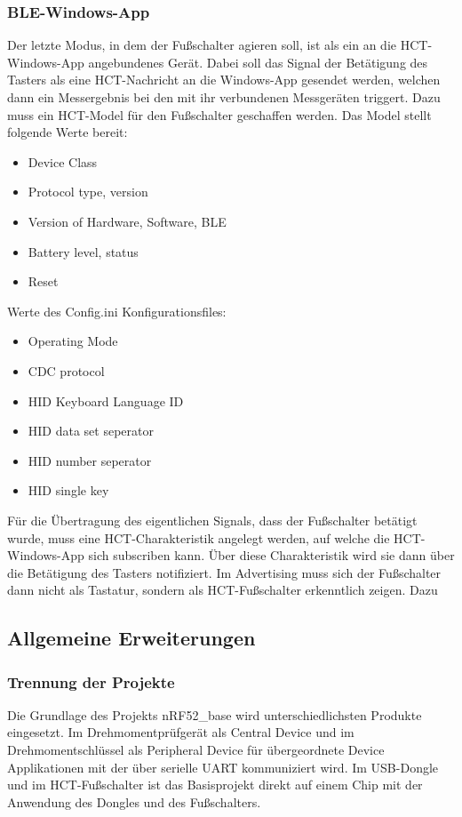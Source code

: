\subsubsection{BLE-Windows-App}
Der letzte Modus, in dem der Fußschalter agieren soll, ist als ein an die HCT-Windows-App angebundenes Gerät. Dabei soll das Signal der Betätigung des Tasters als eine HCT-Nachricht an die Windows-App gesendet werden, welchen dann ein Messergebnis bei den mit ihr verbundenen Messgeräten triggert. Dazu muss ein HCT-Model für den Fußschalter geschaffen werden. Das Model stellt folgende Werte bereit:
\begin{itemize}
	\item Device Class
	\item Protocol type, version 
	\item Version of Hardware, Software, BLE
	\item Battery level, status
	\item Reset 
\end{itemize}

Werte des Config.ini Konfigurationsfiles:
\begin{itemize}
	\item Operating Mode 
	\item CDC protocol 
	\item HID Keyboard Language ID 
	\item HID data set seperator 
	\item HID number seperator
	\item HID single key 
\end{itemize}

Für die Übertragung des eigentlichen Signals, dass der Fußschalter betätigt wurde, muss eine HCT-Charakteristik angelegt werden, auf welche die HCT-Windows-App sich subscriben kann. Über diese Charakteristik wird sie dann über die Betätigung des Tasters notifiziert. Im Advertising muss sich der Fußschalter dann nicht als Tastatur, sondern als HCT-Fußschalter erkenntlich zeigen. Dazu  


\subsection{Allgemeine Erweiterungen}

\subsubsection{Trennung der Projekte}
Die Grundlage des Projekts nRF52\_base wird unterschiedlichsten Produkte eingesetzt. Im Drehmomentprüfgerät als Central Device und im Drehmomentschlüssel als Peripheral Device für übergeordnete Device Applikationen mit der über serielle UART kommuniziert wird. Im USB-Dongle und im HCT-Fußschalter ist das Basisprojekt direkt auf einem Chip mit der Anwendung des Dongles und des Fußschalters. 


